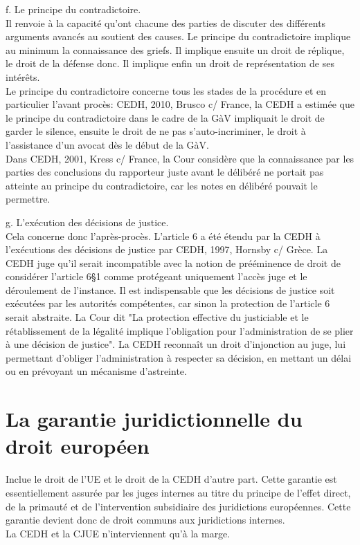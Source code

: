 \documentclass[10pt, a4paper, openany]{book}
\begin{document}
f. Le principe du contradictoire. \\
Il renvoie à la capacité qu'ont chacune des parties de discuter des différents arguments avancés au soutient des causes. Le principe du contradictoire implique au minimum la connaissance des griefs. Il implique ensuite un droit de réplique, le droit de la défense donc. Il implique enfin un droit de représentation de ses intérêts. \\
Le principe du contradictoire concerne tous les stades de la procédure et en particulier l'avant procès: CEDH, 2010, Brusco c/ France, la CEDH a estimée que le principe du contradictoire dans le cadre de la GàV impliquait le droit de garder le silence, ensuite le droit de ne pas s'auto-incriminer, le droit à l'assistance d'un avocat dès le début de la GàV. \\
Dans CEDH, 2001, Kress c/ France, la Cour considère que la connaissance par les parties des conclusions du rapporteur juste avant le délibéré ne portait pas atteinte au principe du contradictoire, car les notes en délibéré pouvait le permettre. 


g. L'exécution des décisions de justice. \\
Cela concerne donc l'après-procès. L'article 6 a été étendu par la CEDH à l'exécutions des décisions de justice par CEDH, 1997, Hornsby c/ Grèce. La CEDH juge qu'il serait incompatible avec la notion de prééminence de droit de considérer l'article 6§1 comme protégeant uniquement l'accès juge et le déroulement de l'instance. Il est indispensable que les décisions de justice soit exécutées par les autorités compétentes, car sinon la protection de l'article 6 serait abstraite. La Cour dit "La protection effective du justiciable et le rétablissement de la légalité implique l'obligation pour l'administration de se plier à une décision de justice". La CEDH reconnaît un droit d'injonction au juge, lui permettant d'obliger l'administration à respecter sa décision, en mettant un délai ou en prévoyant un mécanisme d'astreinte. 

\part{La garantie juridictionnelle du droit européen}

Inclue le droit de l'UE et le droit de la CEDH d'autre part. Cette garantie est essentiellement assurée par les juges internes au titre du principe de l'effet direct, de la primauté et de l'intervention subsidiaire des juridictions européennes. Cette garantie devient donc de droit communs aux juridictions internes. \\
La CEDH et la CJUE n'interviennent qu'à la marge.
\end{document}
